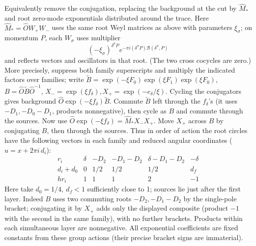 Equivalently remove the conjugation, replacing the background at the cut by \(\widehat M_*\) and root zero-mode exponentials distributed around the trace. Here \(\widehat M_*=\widehat O W_+W_-\) uses the same root Weyl matrices as above with parameters \(\xi_\sigma\); on momentum \(P\), each \(W_\sigma\) uses multiplier
\[
 (-\xi_\sigma)^{\delta^\sigma P} e^{-\pi i(\delta^\sigma P)\mathcal B(\delta^\sigma,P)}
\]
and reflects vectors and oscillators in that root. (The two cross cocycles are zero.) More precisely, suppress both family superscripts and multiply the indicated factors over families; write \(\widetilde B=\exp(-\xi F_0)\exp(\xi F_1)\exp(\xi F_0)\), \(B=\widehat O\widetilde B\widehat O^{-1}\), \(X_-=\exp(\xi f_\delta), X_+=\exp(-e_\delta/\xi)\). Cycling the conjugators gives background \(\widehat O\exp(-\xi f_\delta)\widetilde B\). Commute \(\widetilde B\) left through the \(f_\delta\)'s (it uses \(-D_1,-D_0-D_1\), products nonnegative), then cycle as \(B\) and commute through the sources. Now use \(\widehat O\exp(-\xi f_\delta)=\widehat M_* X_- X_+\). Move \(X_+\) across \(B\) by conjugating \(B\), then through the sources. Thus in order of action the root circles have the following vectors in each family and reduced angular coordinates (\(u=x+2\pi i\,d_i\)):
\begin{equation}
\begin{array}{c|ccccc}
 r_i&\delta&-D_2&-D_1-D_2&\delta-D_1-D_2&-\delta\\ \hline
 d_i+d_0&0&1/2&1/2&1/2&d_f\\
 h r_i&1&1&1&2&-1
\end{array}\label{L:eq3}
\end{equation}
Here take \(d_0=1/4,\ d_f<1\) sufficiently close to 1; sources lie just after the first layer. Indeed \(B\) uses two commuting roots \(-D_2,-D_1-D_2\) by the single-pole bracket; conjugating it by \(X_+\) adds only the displayed composite (product \(-1\) with the second in the same family), with no further brackets. Products within each simultaneous layer are nonnegative. All exponential coefficients are fixed constants from these group actions (their precise bracket signs are immaterial).

